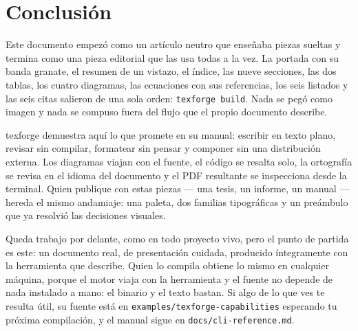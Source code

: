 \section{Conclusión}\label{sec:conclusion}

Este documento empezó como un artículo neutro que enseñaba piezas
sueltas y termina como una pieza editorial que las usa todas a la vez. La
portada con su banda granate, el resumen de un vistazo, el índice, las
nueve secciones, las dos tablas, los cuatro diagramas, las ecuaciones con
sus referencias, los seis listados y las seis citas salieron de una sola
orden: \texttt{texforge build}. Nada se pegó como imagen y nada se
compuso fuera del flujo que el propio documento describe.

texforge demuestra aquí lo que promete en su manual: escribir en texto
plano, revisar sin compilar, formatear sin pensar y componer sin una
distribución externa. Los diagramas viajan con el fuente, el código se
resalta solo, la ortografía se revisa en el idioma del documento y el PDF
resultante se inspecciona desde la terminal. Quien publique con estas
piezas --- una tesis, un informe, un manual --- hereda el mismo andamiaje:
una paleta, dos familias tipográficas y un preámbulo que ya resolvió
las decisiones visuales.

Queda trabajo por delante, como en todo proyecto vivo, pero el punto de
partida es este: un documento real, de presentación cuidada, producido
íntegramente con la herramienta que describe. Quien lo compila obtiene lo
mismo en cualquier máquina, porque el motor viaja con la herramienta y el
fuente no depende de nada instalado a mano: el binario y el texto bastan.
Si algo de lo que ves te resulta útil, su fuente está en
\texttt{examples/texforge-capabilities} esperando tu próxima compilación,
y el manual sigue en \texttt{docs/cli-reference.md}.
